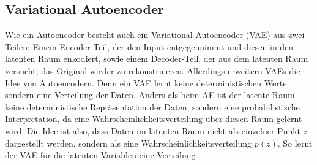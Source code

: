     
\newpage
        \subsection{Variational Autoencoder}   
            \cite{towards_ae_vae, py_mage} Wie ein Autoencoder besteht auch ein Variational Autoencoder (VAE) aus zwei Teilen:
            Einem Encoder-Teil, der den Input entgegennimmt und diesen in den latenten Raum enkodiert, sowie einem Decoder-Teil, der aus dem latenten Raum versucht, das Original wieder zu rekonstruieren.
            Allerdings erweitern VAEs die Idee von Autoencodern. Denn ein VAE lernt keine deterministischen Werte, sondern eine Verteilung der Daten. Anders als beim AE ist der latente Raum keine deterministische Repräsentation der Daten, sondern eine probabilistische Interpretation, da eine Wahrscheinlichkeitsverteilung über diesen Raum gelernt wird.
            Die Idee ist also, dass Daten im latenten Raum nicht als einzelner Punkt $z$ dargestellt werden, sondern als eine Wahrscheinlichkeitsverteilung $p(z)$.
            So lernt der VAE für die latenten Variablen eine Verteilung \cite{vae_paper_1, vae_paper_2}.
            
